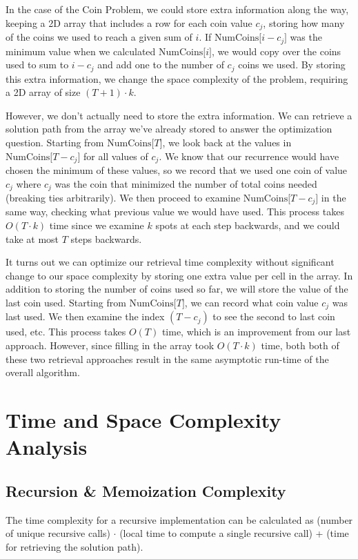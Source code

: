 \documentclass[11pt]{article}
\DeclareRobustCommand{\bigO}{%
    O
}
\begin{document}
In the case of the Coin Problem, we could store extra information along the way, keeping a 2D array that includes a row for each coin value $c_j$, storing how many of the coins we used to reach a given sum of $i$. If $\mathrm{NumCoins}\lbrack i - c_j \rbrack$ was the minimum value when we calculated $\mathrm{NumCoins}\lbrack i \rbrack$, we would copy over the coins used to sum to $i - c_j$ and add one to the number of $c_j$ coins we used. By storing this extra information, we change the space complexity of the problem, requiring a 2D array of size  $(T+1) \cdot k$.

However, we don't actually need to store the extra information. We can retrieve a solution path from the array we've already stored to answer the optimization question. Starting from $\mathrm{NumCoins}\lbrack T \rbrack$, we look back at the values in $\mathrm{NumCoins}\lbrack T - c_j \rbrack$ for all values of $c_j$. We know that our recurrence would have chosen the minimum of these values, so we record that we used one coin of value $c_j$ where $c_j$ was the coin that minimized the number of total coins needed (breaking ties arbitrarily). We then proceed to examine $\mathrm{NumCoins}\lbrack T - c_j \rbrack$ in the same way, checking what previous value we would have used. This process takes $\bigO(T \cdot k)$ time since we examine $k$ spots at each step backwards, and we could take at most $T$ steps backwards. 

It turns out we can optimize our retrieval time complexity without significant change to our space complexity by storing one extra value per cell in the array. In addition to storing the number of coins used so far, we will store the value of the last coin used. Starting from $\mathrm{NumCoins}\lbrack T \rbrack$, we can record what coin value $c_j$ was last used. We then examine the index $(T - c_j)$ to see the second to last coin used, etc. This process takes $\bigO(T)$ time, which is an improvement from our last approach. However, since filling in the array took $\bigO(T \cdot k)$ time, both both of these two retrieval approaches result in the same asymptotic run-time of the overall algorithm.

\section{Time and Space Complexity Analysis}
\subsection*{Recursion \& Memoization Complexity}
The time complexity for a recursive implementation can be calculated as (number of unique recursive calls) $\cdot$ (local time to compute a single recursive call) + (time for retrieving the solution path).
\end{document}
